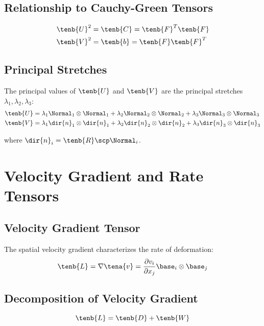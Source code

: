 \subsection{Relationship to Cauchy-Green Tensors}

\begin{align}
\tenb{U}^2 &= \tenb{C} = \tenb{F}^T \tenb{F} \\
\tenb{V}^2 &= \tenb{b} = \tenb{F} \tenb{F}^T
\end{align}

\subsection{Principal Stretches}

The principal values of $\tenb{U}$ and $\tenb{V}$ are the principal stretches $\lambda_1, \lambda_2, \lambda_3$:
\begin{align}
\tenb{U} &= \lambda_1 \Normal_1 \otimes \Normal_1 + \lambda_2 \Normal_2 \otimes \Normal_2 + \lambda_3 \Normal_3 \otimes \Normal_3 \\
\tenb{V} &= \lambda_1 \dir{n}_1 \otimes \dir{n}_1 + \lambda_2 \dir{n}_2 \otimes \dir{n}_2 + \lambda_3 \dir{n}_3 \otimes \dir{n}_3
\end{align}

where $\dir{n}_i = \tenb{R} \scp \Normal_i$.

\section{Velocity Gradient and Rate Tensors}

\subsection{Velocity Gradient Tensor}

The spatial velocity gradient characterizes the rate of deformation:
\begin{equation}
\tenb{L} = \nabla \tena{v} = \frac{\partial v_i}{\partial x_j} \base_i \otimes \base_j
\end{equation}

\subsection{Decomposition of Velocity Gradient}

\begin{equation}
\tenb{L} = \tenb{D} + \tenb{W}
\end{equation}

